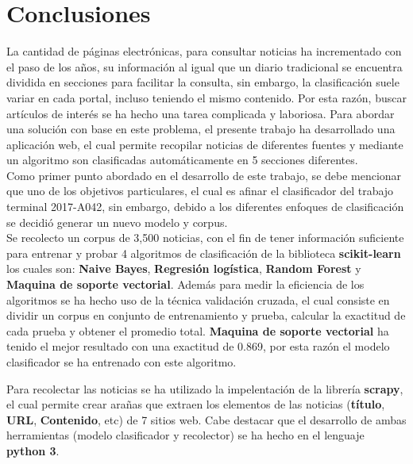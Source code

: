 \section{Conclusiones}

La cantidad de páginas electrónicas, para consultar noticias ha incrementado con el paso de los años, su información al igual que un diario tradicional se encuentra dividida en secciones para facilitar 
la consulta, sin embargo, la clasificación suele variar en cada portal, incluso teniendo el mismo contenido. Por esta razón, buscar artículos de interés se ha hecho una tarea complicada y laboriosa. Para abordar una solución con base en este problema, el presente trabajo ha desarrollado
una aplicación web, el cual permite recopilar noticias de diferentes fuentes y mediante un algoritmo son clasificadas automáticamente en 5 secciones diferentes.\\

Como primer punto abordado en el desarrollo de este trabajo, se debe mencionar que uno de los objetivos particulares, el cual es afinar el clasificador del trabajo terminal 2017-A042, sin embargo, debido a los diferentes enfoques de clasificación se decidió generar un nuevo modelo y corpus.\\ 

Se recolecto un corpus de 3,500 noticias, con el fin de tener información suficiente para entrenar y probar 4 algoritmos de clasificación de la biblioteca \textbf{scikit-learn} los cuales son: \textbf{Naive Bayes}, \textbf{Regresión logística}, \textbf{Random Forest} y \textbf{Maquina de soporte vectorial}. Además para medir la eficiencia de los algoritmos se ha hecho uso de la técnica validación cruzada, el cual consiste en dividir un corpus en conjunto de entrenamiento y prueba, calcular la exactitud de cada prueba y obtener el promedio total. \textbf{Maquina de soporte vectorial} ha tenido el mejor resultado con una exactitud de 0.869, por esta razón el modelo clasificador se ha entrenado con este algoritmo. 

Para recolectar las noticias se ha utilizado la impelentación de la librería \textbf{scrapy}, el cual permite crear arañas que extraen los elementos de las noticias (\textbf{título}, \textbf{URL}, \textbf{Contenido}, etc) de 7 sitios web. Cabe destacar que el desarrollo de ambas herramientas (modelo clasificador y recolector) se ha hecho en el lenguaje \textbf{python 3}.\\

